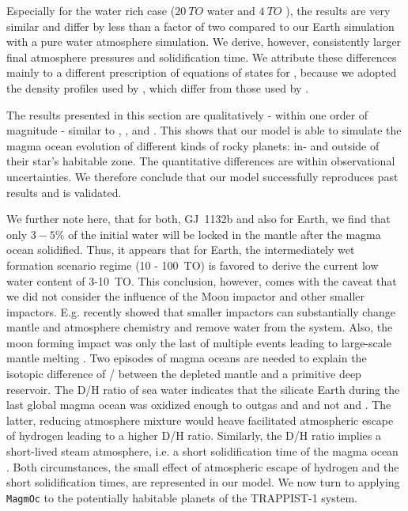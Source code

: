 \documentclass[oneside,twocolumn]{article}
\newcommand{\magmoc}{\texttt{\footnotesize{MagmOc}}}
\begin{document}
Especially for the water rich case ($\SI{20}{TO}$ water and $\SI{4}{TO}$ ), the results are very similar and differ by less than a factor of two compared to our Earth simulation with a pure water atmosphere simulation. We derive, however, consistently larger final atmosphere pressures and solidification time. We attribute these differences mainly to a different prescription of equations of states for , because we adopted the density profiles used by \citet{Schaefer2016}, which differ from those used by \citet{Elkins-Tanton2008}.

The results presented in this section are qualitatively - within one order of magnitude - similar to \cite{Schaefer2016}, \cite{Elkins-Tanton2008}, and \citet{Hamano2013}.
This shows that our model is able to simulate the magma ocean evolution of different kinds of rocky planets: in- and outside of their star's habitable zone.
The quantitative differences are within observational uncertainties. We therefore conclude that our model successfully reproduces past results and is validated. 

We further note here, that for both, GJ~1132b and also for Earth, we find that only $3-5\%$ of the initial water will be locked in the mantle after the magma ocean solidified. Thus, it appears that for Earth, the intermediately wet formation scenario regime (10 - \SI{100}{TO}) is favored to derive the current low water content of 3-\SI{10}{TO}. This conclusion, however, comes with the caveat that we did not consider the influence of the Moon impactor and other smaller impactors. E.g. \citet{zahnle2019} recently showed that smaller impactors can substantially change mantle and atmosphere chemistry and remove water from the system.
Also, the moon forming impact was only the last of multiple events leading to large-scale mantle melting \citep{Jacobson2014,Bottke2015}.
Two episodes of magma oceans are needed to explain the isotopic difference of / between the depleted mantle and a primitive deep reservoir.
The D/H ratio of sea water indicates that the silicate Earth during the last global magma ocean was oxidized enough to outgas  and  and not  and  \citep{Pahlevan2019}.
The latter, reducing atmosphere mixture would heave facilitated atmospheric escape of hydrogen leading to a higher D/H ratio.
Similarly, the D/H ratio implies a short-lived steam atmosphere, i.e. a short solidification time of the magma ocean \citep{Stueken2020}.
Both circumstances, the small effect of atmospheric escape of hydrogen and the short solidification times, are represented in our model.
We now turn to applying \magmoc{} to the potentially habitable planets of the TRAPPIST-1 system. 
\end{document}
